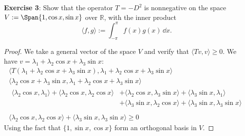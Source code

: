 \documentclass{article}
\begin{document}
\textbf{Exercise 3}: Show that the operator $T = -D^{2}$ is nonnegative on the space $V:= \Span\{1, \cos{x}, \sin{x}\}$ over $\mathbb{R}$, with the inner product
\begin{equation*}
	\langle f, g \rangle := \int_{-\pi}^{\pi} f(x)g(x) \,\dd{x}.
\end{equation*}

\begin{proof}
	We take a general vector of the space $V$ and verify that $\langle Tv,v \rangle \geq 0$. We have $v = \lambda_{1} + \lambda_{2}\cos{x} + \lambda_{3}\sin{x}$:
	\begin{gather*}
		\langle T(\lambda_{1} + \lambda_{2}\cos{x} + \lambda_{3}\sin{x}), \lambda_{1} + \lambda_{2}\cos{x} + \lambda_{3}\sin{x} \rangle \\
		\langle \lambda_{2} \cos{x} + \lambda_{3}\sin{x}, \lambda_{1} + \lambda_{2}\cos{x} + \lambda_{3}\sin{x} \rangle \\
		\begin{split}
			\langle \lambda_{2}\cos{x}, \lambda_{1} \rangle + \langle \lambda_{2}\cos{x}, \lambda_{2}\cos{x} \rangle &+ \langle \lambda_{2}\cos{x}, \lambda_{3}\sin{x} \rangle + \langle \lambda_{3}\sin{x}, \lambda_{1} \rangle \\
													       &+ \langle \lambda_{3}\sin{x}, \lambda_{2}\cos{x} \rangle + \langle \lambda_{3}\sin{x}, \lambda_{3}\sin{x} \rangle \\
		\end{split} \\
		\langle \lambda_{2}\cos{x}, \lambda_{2}\cos{x} \rangle + \langle \lambda_{3}\sin{x}, \lambda_{3}\sin{x} \rangle \geq 0
	\end{gather*}
	Using the fact that $\{1, \sin{x}, \cos{x}\}$ form an orthogonal basis in $V$.
\end{proof}
\end{document}
